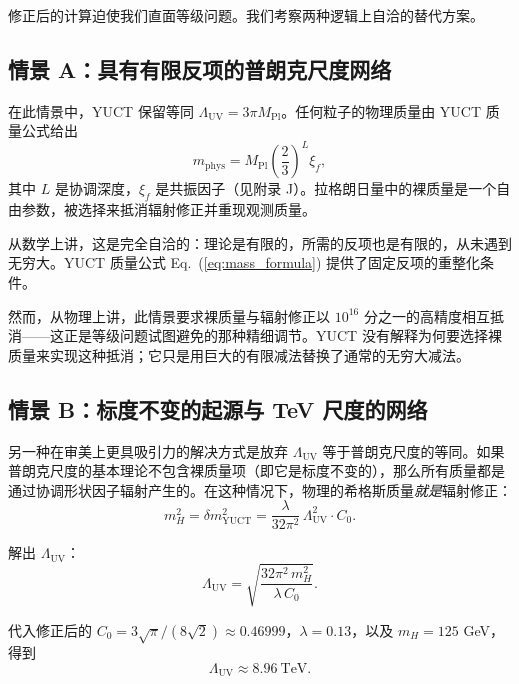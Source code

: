 \documentclass[11pt,a4paper]{article}
\newcommand{\Mpl}{M_{\mathrm{Pl}}}
\newcommand{\LUV}{\Lambda_{\mathrm{UV}}}
\theoremstyle{remark}
\begin{document}
	修正后的计算迫使我们直面等级问题。我们考察两种逻辑上自洽的替代方案。
	
	\subsection{情景 A：具有有限反项的普朗克尺度网络}
	
	在此情景中，YUCT 保留等同 \(\LUV = 3\pi\Mpl\)。任何粒子的物理质量由 YUCT 质量公式给出
	\begin{equation}
		m_{\mathrm{phys}} = \Mpl \left(\frac{2}{3}\right)^L \xi_f,
		\label{eq:mass_formula}
	\end{equation}
	其中 \(L\) 是协调深度，\(\xi_f\) 是共振因子（见附录 J）。拉格朗日量中的裸质量是一个自由参数，被选择来抵消辐射修正并重现观测质量。
	
	从数学上讲，这是完全自洽的：理论是有限的，所需的反项也是有限的，从未遇到无穷大。YUCT 质量公式 Eq.~(\ref{eq:mass_formula}) 提供了固定反项的重整化条件。
	
	然而，从物理上讲，此情景要求裸质量与辐射修正以 \(10^{16}\) 分之一的高精度相互抵消——这正是等级问题试图避免的那种精细调节。YUCT 没有解释为何要选择裸质量来实现这种抵消；它只是用巨大的有限减法替换了通常的无穷大减法。
	
	\subsection{情景 B：标度不变的起源与 TeV 尺度的网络}
	
	另一种在审美上更具吸引力的解决方式是放弃 \(\LUV\) 等于普朗克尺度的等同。如果普朗克尺度的基本理论不包含裸质量项（即它是标度不变的），那么所有质量都是通过协调形状因子辐射产生的。在这种情况下，物理的希格斯质量\textit{就是}辐射修正：
	\begin{equation}
		m_H^2 = \delta m^2_{\mathrm{YUCT}} = \frac{\lambda}{32\pi^2}\,\LUV^2 \cdot C_0.
		\label{eq:scale_inv}
	\end{equation}
	
	解出 \(\LUV\)：
	\begin{equation}
		\LUV = \sqrt{\frac{32\pi^2\, m_H^2}{\lambda\, C_0}}.
		\label{eq:LUV_solve}
	\end{equation}
	
	代入修正后的 \(C_0 = 3\sqrt{\pi}/(8\sqrt{2}) \approx 0.46999\)，\(\lambda = 0.13\)，以及 \(m_H = 125\) GeV，得到
	\begin{equation}
		\boxed{\LUV \approx 8.96\ \mathrm{TeV}}.
		\label{eq:LUV_TeV}
	\end{equation}
	
\end{document}
